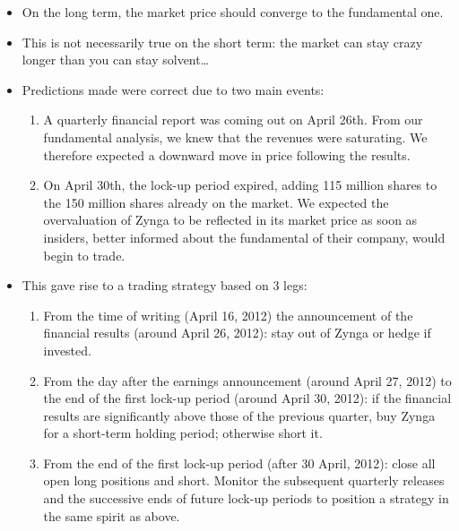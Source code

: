 \begin{itemize}
    \item On the long term, the market price should converge to the
        fundamental one.
    \item This is not necessarily true on the short term: the market can
        stay crazy longer than you can stay solvent\dots
    \item Predictions made were correct due to two main events:
        \begin{enumerate}
            \item A quarterly financial report was coming out on April 26th.
                From our fundamental analysis, we knew that the revenues were
                saturating. We therefore expected a downward move in price
                following the results.
            \item On April 30th, the lock-up period expired, adding 115 million
                shares to the 150 million shares already on the market. We
                expected the overvaluation of Zynga to be reflected in its
                market price as soon as insiders, better informed about the
                fundamental of their company, would begin to trade.
        \end{enumerate}
    \item This gave rise to a trading strategy based on 3 legs:
        \begin{enumerate}
            \item From the time of writing (April 16, 2012) the announcement
                of the financial results (around April 26, 2012): stay out
                of Zynga or hedge if invested.
            \item From the day after the earnings announcement (around April 27,
                2012) to the end of the first lock-up period (around April 30, 2012):
                if the financial results are significantly above those of the previous
                quarter, buy Zynga for a short-term holding period; otherwise short it.
            \item From the end of the first lock-up period (after 30 April, 2012):
                close all open long positions and short. Monitor the subsequent quarterly
                releases and the successive ends of future lock-up periods to position
                a strategy in the same spirit as above.
        \end{enumerate}
\end{itemize}

